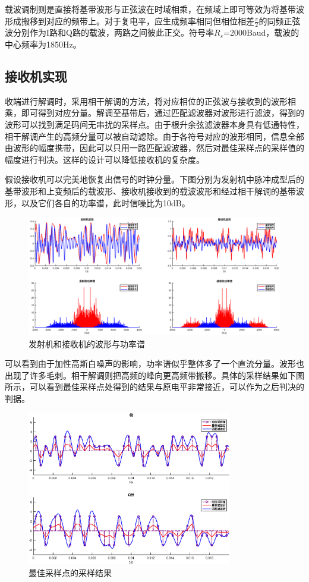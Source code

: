 载波调制则是直接将基带波形与正弦波在时域相乘，在频域上即可等效为将基带波形成搬移到对应的频带上。对于复电平，应生成频率相同但相位相差$\frac{\pi}{2}$的同频正弦波分别作为I路和Q路的载波，两路之间彼此正交。符号率$R_s$=2000Baud，载波的中心频率为1850Hz。

\subsection{接收机实现}

收端进行解调时，采用相干解调的方法，将对应相位的正弦波与接收到的波形相乘，即可得到对应分量。解调至基带后，通过匹配滤波器对波形进行滤波，得到的波形可以找到满足码间无串扰的采样点。由于根升余弦滤波器本身具有低通特性，相干解调产生的高频分量可以被自动滤除。由于各符号对应的波形相同，信息全部由波形的幅度携带，因此可以只用一路匹配滤波器，然后对最佳采样点的采样值的幅度进行判决。这样的设计可以降低接收机的复杂度。

假设接收机可以完美地恢复出信号的时钟分量。下图分别为发射机中脉冲成型后的基带波形和上变频后的载波形、接收机接收到的载波波形和经过相干解调的基带波形，以及它们各自的功率谱，此时信噪比为10dB。

\begin{figure}[h]
    \centering
    \includegraphics[width=\textwidth]{./pic/wave_spectrum.eps}
    \caption{发射机和接收机的波形与功率谱}
\end{figure}

可以看到由于加性高斯白噪声的影响，功率谱似乎整体多了一个直流分量。波形也出现了许多毛刺。相干解调则把高频的峰向更高频带搬移。具体的采样结果如下图所示，可以看到最佳采样点处得到的结果与原电平非常接近，可以作为之后判决的判据。

\begin{figure}[h]
    \centering
    \includegraphics[width=0.8\textwidth]{./pic/sample.eps}
    \caption{最佳采样点的采样结果}
\end{figure}

